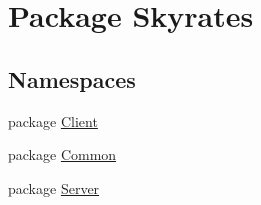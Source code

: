 \hypertarget{namespace_skyrates}{\section{Package Skyrates}
\label{namespace_skyrates}
}
\subsection*{Namespaces}
\begin{DoxyCompactItemize}
\item 
package \hyperlink{namespace_skyrates_1_1_client}{Client}
\item 
package \hyperlink{namespace_skyrates_1_1_common}{Common}
\item 
package \hyperlink{namespace_skyrates_1_1_server}{Server}
\end{DoxyCompactItemize}
